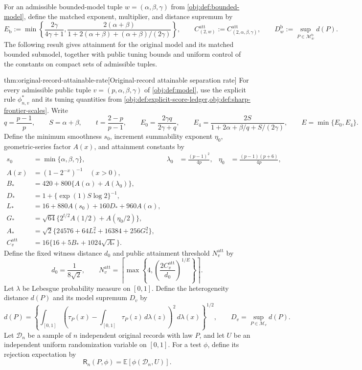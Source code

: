 For an admissible bounded-model tuple \(w=(\alpha,\beta,\gamma)\) from \cref{obj:def:bounded-model}, define the matched exponent, multiplier, and distance supremum by
\[
E_{\mathrm b}
:=\min\left\{\frac{2\gamma}{4\gamma+1},
\frac{2(\alpha+\beta)}
{1+2(\alpha+\beta)+(\alpha+\beta)/(2\gamma)}\right\},
\qquad
C^{\mathrm{att}}_{(2,w)}
:=C^{\mathrm{att}}_{(2,\alpha,\beta,\gamma)},
\qquad
D_w^{\mathrm b}:=\sup_{P\in\mathcal M_w^{\mathrm b}}d(P).
\]
The following result gives attainment for the original model and its matched bounded submodel, together with public tuning bounds and uniform control of the constants on compact sets of admissible tuples.

\begin{theoremv}{thm:original-record-attainable-rate}[Original-record attainable separation rate]
For every admissible public tuple \(v=(p,\alpha,\beta,\gamma)\) of \cref{obj:def:model}, use the explicit rule \(\phi^*_{n,v}\) and its tuning quantities from \cref{obj:def:explicit-score-ledger,obj:def:sharp-frontier-scales}. Write
\[
q=\frac{p-1}{p},\qquad S=\alpha+\beta,\qquad
t=\frac{2-p}{p-1},\qquad
E_0=\frac{2\gamma q}{2\gamma+q},\qquad
E_4=\frac{2S}{1+2\alpha+\beta/q+S/(2\gamma)},\qquad
E=\min\{E_0,E_4\}.
\]
Define the minimum smoothness \(s_0\), increment summability exponent \(\eta_0\), geometric-series factor \(A(x)\), and attainment constants by
\[
\begin{aligned}
s_0&=\min\{\alpha,\beta,\gamma\},&
\lambda_0&=\frac{(p-1)^2}{4p},&
\eta_0&=\frac{(p-1)(p+6)}{4p},\\
A(x)&=(1-2^{-x})^{-1}\quad(x>0),\\
B_*&=420+800\{A(\alpha)+A(\lambda_0)\},\\
D_*&=1+\{\exp(1)S\log 2\}^{-1},\\
L_*&=16+880A(s_0)+160D_*+960A(\alpha),\\
G_*&=\sqrt{64}\{2^{t/2}A(1/2)+A(\eta_0/2)\},\\
A_*&=\sqrt{2}\{24576+64L_*^2+16384+256G_*^2\},\\
C^{\mathrm{att}}_v&=16\{16+5B_*+1024\sqrt{A_*}\}.
\end{aligned}
\]
Define the fixed witness distance \(d_0\) and public attainment threshold \(N^{\mathrm{att}}_v\) by
\[
d_0=\frac{1}{8\sqrt{2}},
\qquad
N^{\mathrm{att}}_v
=\left\lceil\max\left\{4,
\left(\frac{2C^{\mathrm{att}}_v}{d_0}\right)^{1/E}\right\}\right\rceil.
\]
Let \(\lambda\) be Lebesgue probability measure on \([0,1]\). Define the heterogeneity distance \(d(P)\) and its model supremum \(D_v\) by
\[
d(P)=
\left\{\int_{[0,1]}
\left(\tau_P(x)-\int_{[0,1]}\tau_P(z)\,d\lambda(z)\right)^2
\,d\lambda(x)\right\}^{1/2},
\qquad
D_v=\sup_{P\in\mathcal M_v}d(P).
\]
Let \(\mathcal D_n\) be a sample of \(n\) independent original records with law \(P\), and let \(U\) be an independent uniform randomization variable on \([0,1]\). For a test \(\phi\), define its rejection expectation by
\[
\mathsf R_n(P,\phi)=\mathbb E[\phi(\mathcal D_n,U)].
\]


\end{theoremv}
